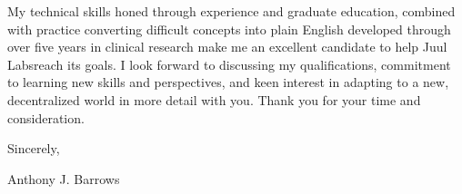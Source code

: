 \documentclass[letterpaper,11pt]{article}
\newcommand{\company}{Juul Labs}
\begin{document}
	
	My technical skills honed through experience and graduate education, combined with practice converting difficult concepts into plain English developed through over five years in clinical research make me an excellent candidate to help \company \space reach its goals. I look forward to discussing my qualifications, commitment to learning new skills and perspectives, and keen interest in adapting to a new, decentralized world in more detail with you. Thank you for your time and consideration.
	
	\vspace{5mm}
	
	Sincerely,
	\vspace{3mm}
	
	Anthony J. Barrows
\end{document}
